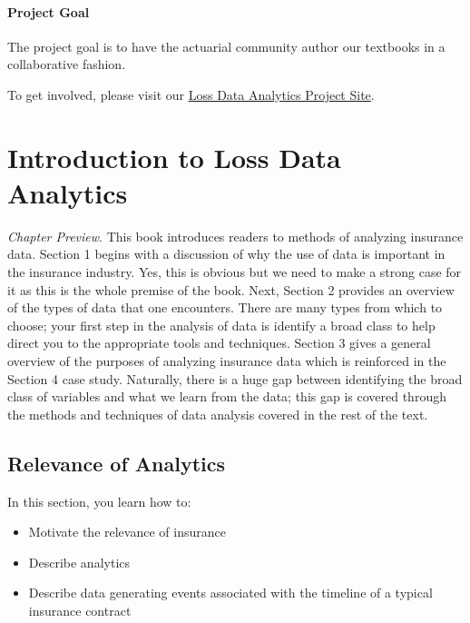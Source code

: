 \documentclass[]{book}
\providecommand{\tightlist}{%
  \setlength{\itemsep}{0pt}\setlength{\parskip}{0pt}}
\begin{document}
\subsubsection*{Project Goal}\label{project-goal}

The project goal is to have the actuarial community author our textbooks
in a collaborative fashion.

To get involved, please visit our
\href{https://sites.google.com/a/wisc.edu/loss-data-analytics/}{Loss
Data Analytics Project Site}.

\chapter{Introduction to Loss Data
Analytics}\label{introduction-to-loss-data-analytics}

\emph{Chapter Preview}. This book introduces readers to methods of
analyzing insurance data. Section 1 begins with a discussion of why the
use of data is important in the insurance industry. Yes, this is obvious
but we need to make a strong case for it as this is the whole premise of
the book. Next, Section 2 provides an overview of the types of data that
one encounters. There are many types from which to choose; your first
step in the analysis of data is identify a broad class to help direct
you to the appropriate tools and techniques. Section 3 gives a general
overview of the purposes of analyzing insurance data which is reinforced
in the Section 4 case study. Naturally, there is a huge gap between
identifying the broad class of variables and what we learn from the
data; this gap is covered through the methods and techniques of data
analysis covered in the rest of the text.

\section{Relevance of Analytics}\label{S:Intro}

In this section, you learn how to:

\begin{itemize}
\tightlist
\item
  Motivate the relevance of insurance
\item
  Describe analytics
\item
  Describe data generating events associated with the timeline of a
  typical insurance contract
\end{itemize}
\end{document}
